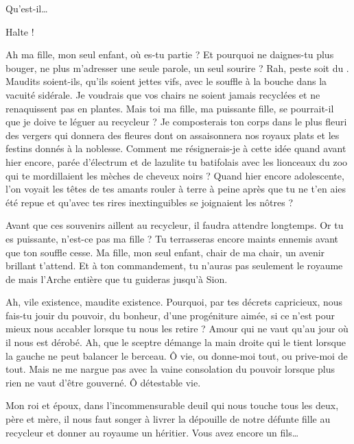 \begin{drama}

  \elenaspeaks {} Qu’est-il…

  \kingsgardsspeaks {} Halte !

  \roispeaks {}  Ah ma fille, mon seul enfant, où es-tu partie ? Et pourquoi ne daignes-tu plus bouger, ne plus m’adresser une seule parole, un seul sourire ? Rah, peste soit du \campoppose{}. Maudits soient-ils, qu’ils soient jettes vifs, avec le souffle à la bouche dans la vacuité sidérale. Je voudrais que vos chairs ne soient jamais recyclées et ne renaquissent  pas en plantes. Mais toi ma fille, ma puissante fille, se pourrait-il que je doive te léguer au recycleur ? Je composterais ton corps dans le plus fleuri des vergers qui donnera des fleures dont on assaisonnera nos royaux plats et les festins donnés à la noblesse. 
  Comment me résignerais-je à cette idée quand avant hier encore, parée d’électrum et de lazulite tu batifolais avec les lionceaux du zoo qui te mordillaient les mèches de cheveux noirs ? Quand hier encore adolescente, l’on voyait les têtes  de tes amants rouler à terre à peine après que tu ne t’en aies été repue et qu’avec tes rires inextinguibles se joignaient les nôtres ?

  Avant que ces souvenirs aillent au recycleur, il faudra attendre longtemps. Or tu es puissante, n’est-ce pas ma fille ? Tu terrasseras encore maints ennemis avant que ton souffle cesse. Ma fille, mon seul enfant, chair de ma chair, un avenir brillant t’attend. Et à ton commandement, tu n’auras pas seulement le royaume de \campprincipal{} mais l’Arche entière que tu guideras jusqu’à Sion.

  Ah, vile existence, maudite existence. Pourquoi, par tes décrets capricieux, nous fais-tu jouir du pouvoir, du bonheur, d’une progéniture aimée, si ce n’est pour mieux nous accabler lorsque tu nous les retire ? Amour qui ne vaut qu’au jour où il nous est dérobé. Ah, que le sceptre démange la main droite qui le tient lorsque la gauche ne peut balancer le berceau. Ô vie, ou donne-moi tout, ou prive-moi de tout. Mais ne me nargue pas  avec la vaine consolation du pouvoir lorsque plus rien ne vaut d’être gouverné. Ô détestable vie.

  \reinespeaks {} Mon roi et époux, dans l’incommensurable deuil qui nous touche tous les deux, père et mère, il nous faut songer à livrer la dépouille de notre défunte fille au recycleur et donner au royaume un héritier. Vous avez encore un fils…


\end{drama}
